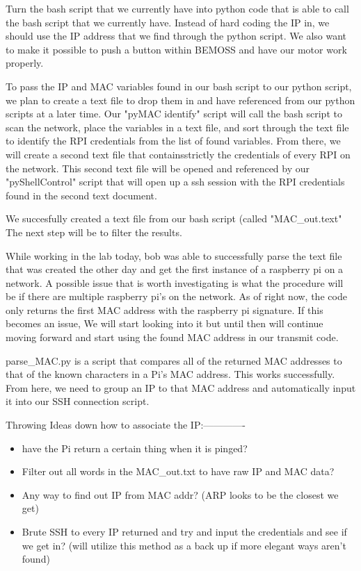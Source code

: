 \documentclass[fontsize=11pt, %
                             paper=letter, %
                             twoside, %
                             captions=tableheading,
                             index=totoc,
                             hyperref]{labbook}
\begin{document}

Turn the bash script that we currently have into python code that is able to call the bash script that we currently have. Instead of hard coding the IP in, we should use the IP address that we find through the python script.
We also want to make it possible to push a button within BEMOSS and have our motor work properly.

To pass the IP and MAC variables found in our bash script to our python script, we plan to create a text file to drop them in and have referenced from our python scripts at a later time. Our "pyMAC identify" script will call the bash script to scan the network, place the variables in a text file, and sort through the text file to identify the RPI credentials from the list of found variables. From there, we will create a second text file that containsstrictly the credentials of every RPI on the network. This second text file will be opened and referenced by our "pyShellControl" script that will open up a ssh session with the RPI credentials found in the second text document. 

We succesfully created a text file from our bash script (called "MAC\_out.text" The next step will be to filter the results. 

While working in the lab today, bob was able to successfully parse the text file that was created the other day and get the first instance of a raspberry pi on a network. A possible issue that is worth investigating is what the procedure will be if there are multiple raspberry pi's on the network. As of right now, the code only returns the first MAC address with the raspberry pi signature. If this becomes an issue, We will start looking into it but until then will continue moving forward and start using the found MAC address in our transmit code.

parse\_MAC.py is a script that compares all of the returned MAC addresses to that of the known characters in a Pi's MAC address. This works successfully. From here, we need to group an IP to that MAC address and automatically input it into our SSH connection script. 

Throwing Ideas down how to associate the IP:-------------
\begin{itemize}
    \item have the Pi return a certain thing when it is pinged?
    \item Filter out all words in the MAC\_out.txt to have raw IP and MAC data? 
    \item Any way to find out IP from MAC addr? (ARP looks to be the closest we get)
    \item  Brute SSH to every IP returned and try and input the credentials and see if we get in? (will utilize this method as a back up if more elegant ways aren't found) 
\end{itemize}
    
\end{document}
